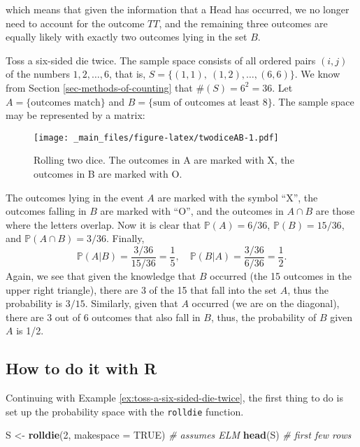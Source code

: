 \documentclass[]{book}
\newenvironment{Shaded}{\begin{snugshade}}{\end{snugshade}}
\newcommand{\KeywordTok}[1]{\textcolor[rgb]{0.13,0.29,0.53}{\textbf{{#1}}}}
\newcommand{\DataTypeTok}[1]{\textcolor[rgb]{0.13,0.29,0.53}{{#1}}}
\newcommand{\DecValTok}[1]{\textcolor[rgb]{0.00,0.00,0.81}{{#1}}}
\newcommand{\StringTok}[1]{\textcolor[rgb]{0.31,0.60,0.02}{{#1}}}
\newcommand{\CommentTok}[1]{\textcolor[rgb]{0.56,0.35,0.01}{\textit{{#1}}}}
\newcommand{\OtherTok}[1]{\textcolor[rgb]{0.56,0.35,0.01}{{#1}}}
\newcommand{\NormalTok}[1]{{#1}}
\numberwithin{equation}{chapter}
\numberwithin{figure}{chapter}
\theoremstyle{plain}
\theoremstyle{definition}
\theoremstyle{remark}
\theoremstyle{definition}
\theoremstyle{definition}
\theoremstyle{remark}
\let\BeginKnitrBlock\begin \let\EndKnitrBlock\end
\begin{document}
which means that given the information that a Head has occurred, we no
longer need to account for the outcome \(TT\), and the remaining three
outcomes are equally likely with exactly two outcomes lying in the set
\(B\).

\bigskip

\BeginKnitrBlock{example}
\protect\hypertarget{ex:toss-a-six-sided-die-twice}{}{\label{ex:toss-a-six-sided-die-twice}}Toss
a six-sided die twice. The sample space consists of all ordered pairs
\((i,j)\) of the numbers \(1,2,\ldots,6\), that is,
\(S = \{ (1,1),\ (1,2),\ldots,(6,6) \} \). We know from Section
\ref{sec-methods-of-counting} that \(\# (S) = 6^{2} = 36\). Let
\(A = \{ \mbox{outcomes match} \}\) and
\(B = \{ \mbox{sum of outcomes at least 8} \}\). The sample space may be
represented by a matrix:
\EndKnitrBlock{example}

\begin{figure}[htbp]
\centering
\texttt{[image: \_main\_files/figure-latex/twodiceAB-1.pdf]}
\caption{\label{fig:twodiceAB}\small Rolling two dice. The outcomes in A are
marked with X, the outcomes in B are marked with O.}
\end{figure}




The outcomes lying in the event \(A\) are marked with the symbol ``X'',
the outcomes falling in \(B\) are marked with ``O'', and the outcomes in
\(A\cap B\) are those where the letters overlap. Now it is clear that
\(\mathbb{P}(A)=6/36\), \(\mathbb{P}(B)=15/36\), and
\(\mathbb{P}(A\cap B)=3/36\). Finally, \[
\mathbb{P}(A|B)=\frac{3/36}{15/36}=\frac{1}{5},\quad
\mathbb{P}(B|A)=\frac{3/36}{6/36}=\frac{1}{2}.  
\] Again, we see that given the knowledge that \(B\) occurred (the 15
outcomes in the upper right triangle), there are 3 of the 15 that fall
into the set \(A\), thus the probability is \(3/15\). Similarly, given
that \(A\) occurred (we are on the diagonal), there are 3 out of 6
outcomes that also fall in \(B\), thus, the probability of \(B\) given
\(A\) is 1/2.

\subsection{How to do it with R}\label{how-to-do-it-with-r-15}

Continuing with Example \ref{ex:toss-a-six-sided-die-twice}, the first
thing to do is set up the probability space with the \texttt{rolldie}
function.

\begin{Shaded}
\begin{Highlighting}[]
\NormalTok{S <-}\StringTok{ }\KeywordTok{rolldie}\NormalTok{(}\DecValTok{2}\NormalTok{, }\DataTypeTok{makespace =} \OtherTok{TRUE}\NormalTok{)  }\CommentTok{# assumes ELM}
\KeywordTok{head}\NormalTok{(S)                            }\CommentTok{#  first few rows}
\end{Highlighting}
\end{Shaded}
\end{document}
